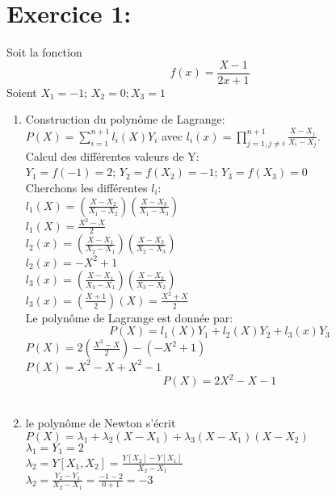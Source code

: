 \documentclass[17pt,a4paper]{article}
\begin{document}
\section{Exercice 1:}

Soit la fonction \[f(x)=\frac{X-1}{2x+1}\]Soient $X_{1}=-1$; $X_{2}=0; X_{3}=1$ \\
\begin{enumerate}
\item Construction du polynôme de Lagrange:\\
$P(X)= \displaystyle\sum_{i=1}^{n+1}l_{i}(X)Y_{i}$ avec ${l_{i}}(x)=\displaystyle\prod_{j=1,j\neq i}^{n+1} \frac{X-X_{j}}{X_{i}-X_{j}}$.\\

Calcul des différentes valeurs de Y:\\
$Y_{1}=f(-1)=2$; $Y_{2}=f(X_{2})=-1$; $Y_{3}=f(X_{3})=0$ \\

Cherchons les différentes $l_{i}$:\\
$l_{1}(X)=(\frac{X-X_{2}}{X_{1}-X_{2}})(\frac{X-X_{3}}{X_{1}-X_{3}})$\\
$l_{1}(X)=\frac{X^{2}-X}{2}$ \\ 

$l_{2}(x)=(\frac{X-X_{1}}{X_{2}-X_{1}})(\frac{X-X_{3}}{X_{2}-X_{3}})$\\
$l_{2}(x)= -X^{2}+1$ \\

$l_{3}(x)=(\frac{X-X_{1}}{X_{3}-X_{1}})(\frac{X-X_{2}}{X_{3}-X_{2}})$\\
$l_{3}(x)= (\frac{X+1}{2})(X)=\frac{X^{2}+X}{2}$ \\

Le polynôme de Lagrange est donnée par:\\

\[P(X)=l_{1}(X)Y_{1}+l_{2}(X)Y_{2}+l_{3}(x)Y_{3}\]
$P(X)=2(\frac{X^{2}-X}{2})-(-X^{2}+1)$ \\
$P(X)= X^{2}-X+X^{2}-1 $
  \[\boxed{P(X)=2X^{2}-X-1}\] \\

\item  le polynôme de Newton s'écrit \\ $P(X)=\lambda_{1}+\lambda_{2}(X-X_{1})+\lambda_{3}(X-X_{1})(X-X_{2})$ \\
 
$\lambda_{1}=Y_{1}=2$\\

$\lambda_{2}=Y[X_{1},X_{2}]=\frac{Y[X_{2}]-Y[X_{1}]}{X_{2}-X_{1}}$\\
$\lambda_{2}=\frac{Y_{2}-Y_{1}}{X_{2}-X_{1}}=\frac{-1-2}{0+1}=-3$ \\


\end{enumerate}
\end{document}
